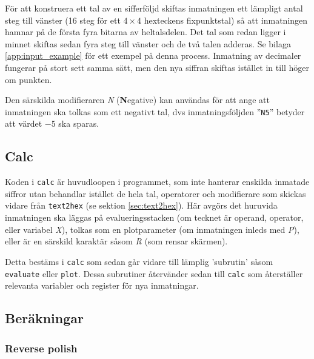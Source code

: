 \documentclass[]{article}
\begin{document}
För att konstruera ett tal av en sifferföljd skiftas inmatningen ett lämpligt antal steg till vänster (16 steg för ett $4 \times 4$ hexteckens fixpunktstal) så att inmatningen hamnar på de första fyra bitarna av heltalsdelen. Det tal som redan ligger i minnet skiftas sedan fyra steg till vänster och de två talen adderas. Se bilaga \ref{app:input_example} för ett exempel på denna process. Inmatning av decimaler fungerar på stort sett samma sätt, men den nya siffran skiftas istället in till höger om punkten.

Den särskilda modifieraren \textit{N} (\textbf{N}egative) kan användas för att ange att inmatningen ska tolkas som ett negativt tal, dvs inmatningsföljden ''\texttt{N5}'' betyder att värdet $-5$ ska sparas.

\subsection{Calc}
Koden i \texttt{calc} är huvudloopen i programmet, som inte hanterar enskilda inmatade siffror utan behandlar istället de hela tal, operatorer och modifierare som skickas vidare från \texttt{text2hex} (se sektion \ref{sec:text2hex}). Här avgörs det huruvida inmatningen ska läggas på evalueringsstacken (om tecknet är operand, operator, eller variabel \textit{X}), tolkas som en plotparameter (om inmatningen inleds med \textit{P}), eller är en särskild karaktär såsom \textit{R} (som rensar skärmen).

Detta bestäms i \texttt{calc} som sedan går vidare till lämplig 'subrutin' såsom \texttt{evaluate} eller \texttt{plot}. Dessa subrutiner återvänder sedan till \texttt{calc} som återställer relevanta variabler och register för nya inmatningar.

\subsection{Beräkningar}
\subsubsection{Reverse polish}
\label{sec:reversepolish}
\end{document}
